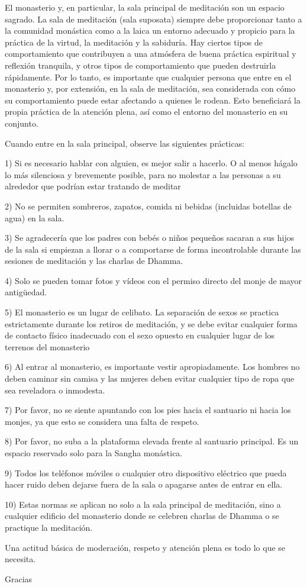 El monasterio y, en particular, la sala principal de meditación son un espacio sagrado. La sala de meditación (sala suposata) siempre debe proporcionar tanto a la comunidad monástica como a la laica un entorno adecuado y propicio para la práctica de la virtud, la meditación y la sabiduría. Hay ciertos tipos de comportamiento que contribuyen a una atmósfera de buena práctica espiritual y reflexión tranquila, y otros tipos de comportamiento que pueden destruirla rápidamente. Por lo tanto, es importante que cualquier persona que entre en el monasterio y, por extensión, en la sala de meditación, sea considerada con cómo su comportamiento puede estar afectando a quienes le rodean. Esto beneficiará la propia práctica de la atención plena, así como el entorno del monasterio en su conjunto.

Cuando entre en la sala principal, observe las siguientes prácticas:

1) Si es necesario hablar con alguien, es mejor salir a hacerlo. O al menos hágalo lo más silenciosa y brevemente posible, para no molestar a las personas a su alrededor que podrían estar tratando de meditar

2) No se permiten sombreros, zapatos, comida ni bebidas (incluidas botellas de agua) en la sala.

3) Se agradecería que los padres con bebés o niños pequeños sacaran a sus hijos de la sala si empiezan a llorar o a comportarse de forma incontrolable durante las sesiones de meditación y las charlas de Dhamma.

4) Solo se pueden tomar fotos y vídeos con el permiso directo del monje de mayor antigüedad.

5) El monasterio es un lugar de celibato. La separación de sexos se practica estrictamente durante los retiros de meditación, y se debe evitar cualquier forma de contacto físico inadecuado con el sexo opuesto en cualquier lugar de los terrenos del monasterio


6) Al entrar al monasterio, es importante vestir apropiadamente. Los hombres no deben caminar sin camisa y las mujeres deben evitar cualquier tipo de ropa que sea reveladora o inmodesta.

7) Por favor, no se siente apuntando con los pies hacia el santuario ni hacia los monjes, ya que esto se considera una falta de respeto.

8) Por favor, no suba a la plataforma elevada frente al santuario principal. Es un espacio reservado solo para la Sangha monástica.

9) Todos los teléfonos móviles o cualquier otro dispositivo eléctrico que pueda hacer ruido deben dejarse fuera de la sala o apagarse antes de entrar en ella.

10) Estas normas se aplican no solo a la sala principal de meditación, sino a cualquier edificio del monasterio donde se celebren charlas de Dhamma o se practique la meditación.

Una actitud básica de moderación, respeto y atención plena es todo lo que se necesita.

Gracias




